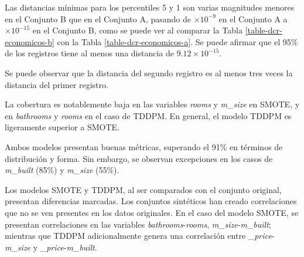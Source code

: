 
\newpage
Las distancias mínimas para los percentiles 5 y 1 son varias magnitudes menores en el Conjunto B que en el Conjunto A, pasando de $\times 10^{-9}$ en el Conjunto A a $\times 10^{-15}$ en el Conjunto B, como se puede ver al comparar la Tabla \ref{table-dcr-economicos-b} con la Tabla \ref{table-dcr-economicos-a}. Se puede afirmar que el 95\% de los registros tiene al menos una distancia de $9.12 \times 10^{-15}$.




\newpage
Se puede observar que la distancia del segundo registro es al menos tres veces la distancia del primer registro.




\newpage
La cobertura es notablemente baja en las variables \emph{rooms} y \emph{m\_size} en SMOTE, y en \emph{bathrooms} y \emph{rooms} en el caso de TDDPM. En general, el modelo TDDPM es ligeramente superior a SMOTE.


Ambos modelos presentan buenas métricas, superando el 91\% en términos de distribución y forma. Sin embargo, se observan excepciones en los casos de \emph{m\_built} (85\%) y \emph{m\_size} (55\%).


\newpage
Los modelos SMOTE y TDDPM, al ser comparados con el conjunto original, presentan diferencias marcadas. Los conjuntos sintéticos han creado correlaciones que no se ven presentes en los datos originales. En el caso del modelo SMOTE, se presentan correlaciones en las variables \emph{bathrooms}-\emph{rooms}, \emph{m\_size}-\emph{m\_built}; mientras que TDDPM adicionalmente genera una correlación entre \emph{\_price}-\emph{m\_size} y \emph{\_price}-\emph{m\_built}.






